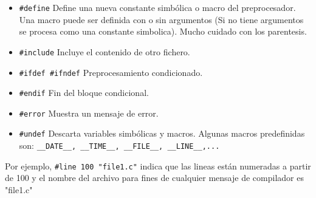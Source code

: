 \documentclass[11pt,a4paper]{article}
\begin{document}
\begin{itemize}
\item \lstinline!#define! Define una nueva constante simb\'olica o macro del preprocesador. Una macro puede ser definida con o sin argumentos (Si no tiene argumentos se procesa como una constante simbolica). Mucho cuidado con los parentesis.
\item \lstinline!#include! Incluye el contenido de otro fichero.
\item \lstinline!#ifdef #ifndef! Preprocesamiento condicionado.
\item \lstinline!#endif! Fin del bloque condicional.
\item \lstinline!#error! Muestra un mensaje de error.
\item \lstinline!#undef! Descarta variables simb\'olicas y macros. Algunas macros predefinidas son: \lstinline!__DATE__, __TIME__, __FILE__, __LINE__,...!
\end{itemize}

Por ejemplo, \lstinline!#line 100 "file1.c"! indica que las lineas est\'an numeradas a partir de 100 y el nombre del archivo para fines de cualquier mensaje de compilador es "file1.c"
\end{document}
